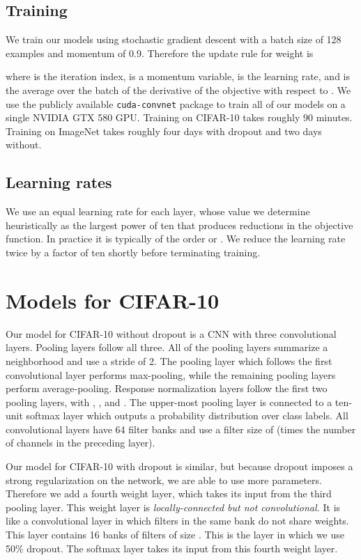 \documentclass[12pt]{article}
\begin{document}
\subsection{Training}

We train our models using stochastic gradient descent with a batch
size of 128 examples and momentum of 0.9. Therefore the update rule
for weight  is

where  is the iteration index,  is a momentum variable, 
is the learning rate, and 
is the average over the  batch of the derivative of the objective
with respect to . We use the publicly available \texttt{cuda-convnet}
package to train all of our models on a single NVIDIA GTX 580 GPU.
Training on CIFAR-10 takes roughly 90 minutes. Training on ImageNet
takes roughly four days with dropout and two days without.


\subsection{Learning rates}

We use an equal learning rate for each layer, whose value we determine
heuristically as the largest power of ten that produces reductions
in the objective function. In practice it is typically of the order
 or . We reduce the learning rate twice by a
factor of ten shortly before terminating training.


\section{Models for CIFAR-10}

Our model for CIFAR-10 without dropout is a CNN with three convolutional
layers. Pooling layers follow all three. All of the pooling layers
summarize a  neighborhood and use a stride of 2. The pooling
layer which follows the first convolutional layer performs max-pooling,
while the remaining pooling layers perform average-pooling. Response
normalization layers follow the first two pooling layers, with ,
, and . The upper-most pooling layer is
connected to a ten-unit softmax layer which outputs a probability
distribution over class labels. All convolutional layers have 64 filter banks
and use a filter size of  (times the number of channels
in the preceding layer).

Our model for CIFAR-10 with dropout is similar, but because dropout
imposes a strong regularization on the network, we are able to use
more parameters. Therefore we add a fourth weight layer, which takes
its input from the third pooling layer. This weight layer is \emph{locally-connected
but not convolutional.} It is like a convolutional layer in which
filters in the same bank do not share weights. This layer contains
16 banks of filters of size . This is the layer in which
we use 50\% dropout. The softmax layer takes its input from this fourth
weight layer.
\end{document}

